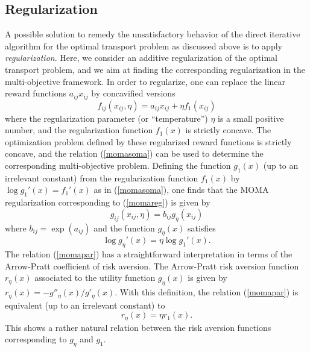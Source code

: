 \documentclass{article}
\theoremstyle{definition}
\begin{document}
\subsection{Regularization}

A possible solution to remedy the unsatisfactory behavior of the direct iterative algorithm for the optimal transport problem as discussed above is to apply \emph{regularization}. Here, we consider an additive regularization of the optimal transport problem, and we aim at finding the corresponding regularization in the multi-objective framework. In order to regularize, one can replace the linear reward functions $a_{ij}x_{ij}$ by concavified versions
\begin{equation} \label{somareg}
f_{ij}(x_{ij},\eta) = a_{ij}x_{ij} + \eta f_1(x_{ij})
\end{equation}
where the regularization parameter (or ``temperature'') $\eta$ is a small positive number, and the regularization function $f_1(x)$ is strictly concave. The optimization problem defined by these regularized reward functions is strictly concave, and the relation (\ref{momasoma}) can be used to determine the corresponding multi-objective problem. Defining the function $g_1(x)$ (up to an irrelevant constant) from the
regularization function $f_1(x)$ by $\log g_1'(x) = f_1'(x)$ as in (\ref{momasoma}), one finds that the MOMA regularization corresponding to (\ref{momareg}) is given by
\begin{equation} \label{momareg}
g_{ij}(x_{ij},\eta) = b_{ij} g_\eta(x_{ij})
\end{equation}
where $b_{ij} = \exp(a_{ij})$ and the function $g_\eta(x)$ satisfies
\begin{equation} \label{momapar}
\log g_\eta'(x) = \eta \log g_1'(x).
\end{equation}
The relation (\ref{momapar}) has a straightforward interpretation in terms of the Arrow-Pratt coefficient of risk aversion. The Arrow-Pratt risk aversion function $r_\eta(x)$ associated to the utility function $g_\eta(x)$ is given by $r_\eta(x) = - g''_\eta(x)/g'_\eta(x)$. With this definition, the relation (\ref{momapar}) is equivalent (up to an irrelevant constant) to
\begin{equation} \label{ra}
r_\eta(x) = \eta r_1(x).
\end{equation}
This shows a rather natural relation between the risk aversion functions corresponding to $g_\eta$ and $g_1$.
\end{document}
